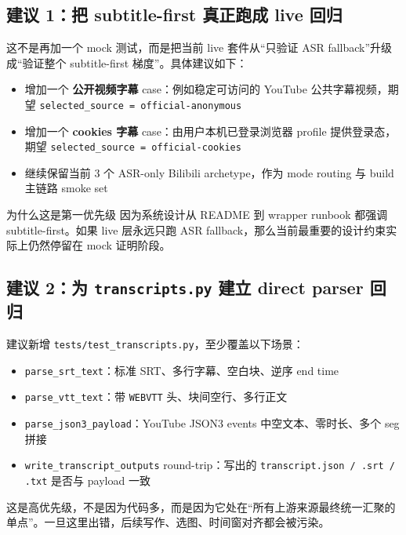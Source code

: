 \documentclass[a4paper]{article}
\begin{document}
\subsection{建议 1：把 subtitle-first 真正跑成 live 回归}

这不是再加一个 mock 测试，而是把当前 live 套件从“只验证 ASR fallback”升级成“验证整个 subtitle-first 梯度”。具体建议如下：

\begin{itemize}
\item 增加一个 \textbf{公开视频字幕} case：例如稳定可访问的 YouTube 公共字幕视频，期望 \texttt{selected\_source = official-anonymous}
\item 增加一个 \textbf{cookies 字幕} case：由用户本机已登录浏览器 profile 提供登录态，期望 \texttt{selected\_source = official-cookies}
\item 继续保留当前 3 个 ASR-only Bilibili archetype，作为 mode routing 与 build 主链路 smoke set
\end{itemize}

\begin{riskbox}{为什么这是第一优先级}
因为系统设计从 README 到 wrapper runbook 都强调 subtitle-first。如果 live 层永远只跑 ASR fallback，那么当前最重要的设计约束实际上仍然停留在 mock 证明阶段。
\end{riskbox}

\subsection{建议 2：为 \texttt{transcripts.py} 建立 direct parser 回归}

建议新增 \texttt{tests/test\_transcripts.py}，至少覆盖以下场景：

\begin{itemize}
\item \texttt{parse\_srt\_text}：标准 SRT、多行字幕、空白块、逆序 end time
\item \texttt{parse\_vtt\_text}：带 \texttt{WEBVTT} 头、块间空行、多行正文
\item \texttt{parse\_json3\_payload}：YouTube JSON3 events 中空文本、零时长、多个 seg 拼接
\item \texttt{write\_transcript\_outputs} round-trip：写出的 \texttt{transcript.json / .srt / .txt} 是否与 payload 一致
\end{itemize}

这是高优先级，不是因为代码多，而是因为它处在“所有上游来源最终统一汇聚的单点”。一旦这里出错，后续写作、选图、时间窗对齐都会被污染。
\end{document}
